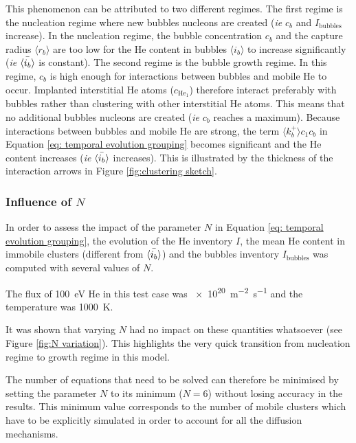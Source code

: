 This phenomenon can be attributed to two different regimes.
The first regime is the nucleation regime where new bubbles nucleons are created (\textit{ie} $c_b$ and $I_\mathrm{bubbles}$ increase).
In the nucleation regime, the bubble concentration $c_b$ and the capture radius $\langle r_b \rangle$ are too low for the He content in bubbles $\langle i_b \rangle$ to increase significantly (\textit{ie} $\Bar{\langle i_b \rangle}$ is constant).
The second regime is the bubble growth regime.
In this regime, $c_b$ is high enough for interactions between bubbles and mobile He to occur.
Implanted interstitial He atoms ($c_{\mathrm{He}_1}$) therefore interact preferably with bubbles rather than clustering with other interstitial He atoms.
This means that no additional bubbles nucleons are created (\textit{ie} $c_b$ reaches a maximum).
Because interactions between bubbles and mobile He are strong, the term $\langle k_b^+ \rangle c_1 c_b$ in Equation \ref{eq: temporal evolution grouping} becomes significant and the He content increases (\textit{ie} $\Bar{\langle i_b \rangle}$ increases).
This is illustrated by the thickness of the interaction arrows in Figure \ref{fig:clustering sketch}.


\subsubsection{Influence of $N$} \label{impact of N}
In order to assess the impact of the parameter $N$ in Equation \ref{eq: temporal evolution grouping}, the evolution of the He inventory $I$, the mean He content in immobile clusters (different from $\Bar{\langle i_b \rangle}$) and the bubbles inventory $I_\mathrm{bubbles}$ was computed with several values of $N$.

The flux of \SI{100}{eV} He in this test case was \SI{e20}{m^{-2} s^{-1}} and the temperature was \SI{1000}{K}. 

It was shown that varying $N$ had no impact on these quantities whatsoever (see Figure \ref{fig:N variation}).
This highlights the very quick transition from nucleation regime to growth regime in this model.

The number of equations that need to be solved can therefore be minimised by setting the parameter $N$ to its minimum ($N=6$) without losing accuracy in the results.
This minimum value corresponds to the number of mobile clusters which have to be explicitly simulated in order to account for all the diffusion mechanisms.

